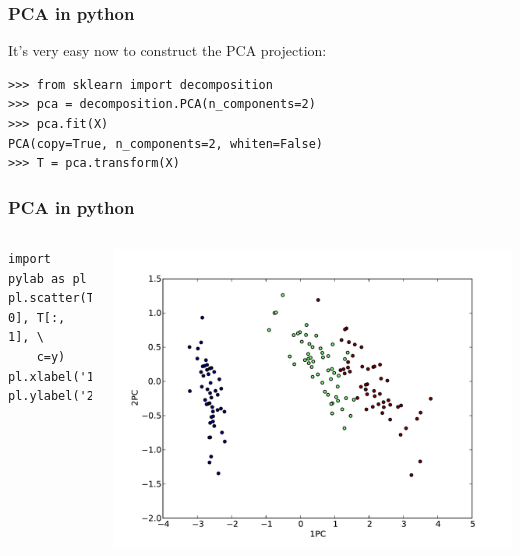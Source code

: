 \documentclass[10pt, colorlinks]{beamer}
\begin{document}
\begin{frame}[fragile]\frametitle{PCA in python }
It's very easy now to construct the PCA projection:
\begin{verbatim}
>>> from sklearn import decomposition
>>> pca = decomposition.PCA(n_components=2)
>>> pca.fit(X)
PCA(copy=True, n_components=2, whiten=False)
>>> T = pca.transform(X)
\end{verbatim}

\end{frame}

\begin{frame}[fragile]\frametitle{PCA in python}

\begin{columns}[c]
\begin{verbatim}
import pylab as pl
pl.scatter(T[:, 0], T[:, 1], \
    c=y) 
pl.xlabel('1PC')
pl.ylabel('2PC')
\end{verbatim}

\includegraphics[width=\textwidth]{plwfigis/CursP_4_figure11}

\end{columns}
\end{frame}
\end{document}

